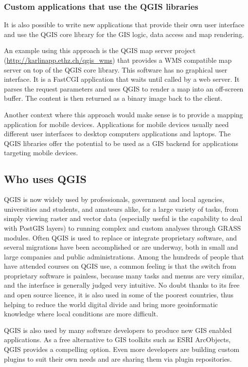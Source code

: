 \subsubsection{Custom applications that use the QGIS libraries}
It is also possible to write new applications that provide their own user
interface and use the QGIS core library for the GIS logic, data access and map
rendering. 

An example using this approach is the QGIS map server project
(\url{http://karlinapp.ethz.ch/qgis\_wms}) that provides a WMS
compatible map server on top of the QGIS core library. This software has no 
graphical user interface. It is a FastCGI application that waits until called
by a web server. It parses the request parameters and uses QGIS to render a map
into an off-screen buffer. The content is then returned as a binary image back
to
the client.

Another context where this approach would make sense is to provide a mapping
application for mobile devices. Applications for mobile devices usually need
different user interfaces to desktop computers applications and
laptops. The QGIS libraries offer the potential to be used as a GIS backend for 
applications targeting mobile devices.

\subsection{Who uses QGIS}
QGIS is now widely used by professionals, government and local agencies,
universities and students, and amateurs alike, for a large variety of tasks,
from simply viewing raster and vector data (especially useful is the capability
to deal with PostGIS layers) to running complex and custom analyses through
GRASS modules. Often QGIS is used to replace or integrate proprietary software,
and
several migrations have been accomplished or are underway, both in small and 
large companies and public administrations. Among the hundreds of people that
have attended courses on QGIS use, a common feeling is that the switch from
proprietary software is painless, because many tasks and menus are very similar,
and the interface is generally judged very intuitive. No doubt thanks to its
free and open source licence, it is also used in some of the poorest countries,
thus helping to reduce the world digital divide and bring more geoinformatic
knowledge where local conditions are more difficult.

QGIS is also used by many software developers to produce new GIS enabled
applications. As a free alternative to GIS toolkits such as ESRI ArcObjects,
QGIS provides a compelling option. Even more developers are building custom
plugins to suit their own needs and are sharing them via plugin repositories.

